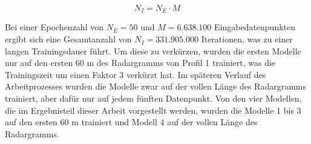 \begin{equation}
    N_I = N_E \cdot M
\end{equation}

\noindent Bei einer Epochenzahl von $N_E = 50$ und $M = 6.638.100$ Eingabedatenpunkten ergibt sich eine Gesamtanzahl von $N_I = 331.905.000$ Iterationen, was zu einer langen Trainingsdauer führt. Um diese zu verkürzen, wurden die ersten Modelle nur auf den ersten 60 m des Radargramms von Profil 1 trainiert, was die Trainingszeit um einen Faktor 3 verkürzt hat. Im späteren Verlauf des Arbeitprozesses wurden die Modelle zwar auf der vollen Länge des Radargramms trainiert, aber dafür nur auf jedem fünften Datenpunkt. Von den vier Modellen, die im Ergebnisteil dieser Arbeit vorgestellt werden, wurden die Modelle 1 bis 3 auf den ersten 60 m trainiert und Modell 4 auf der vollen Länge des Radargramms.\\


